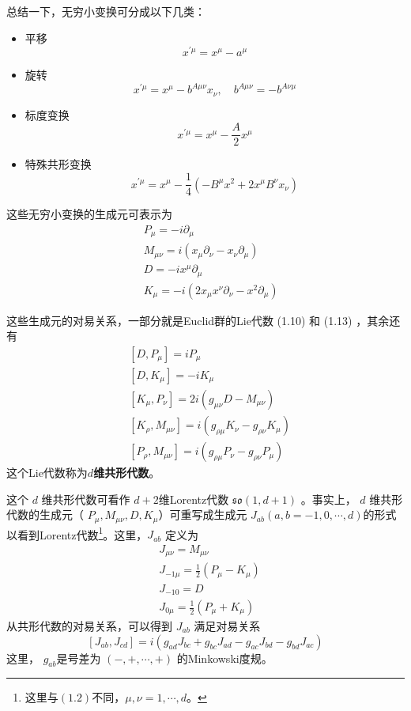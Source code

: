 总结一下，无穷小变换可分成以下几类：
\begin{itemize}
	\item 平移
	\begin{equation}
		x^{\prime \mu}=x^{\mu}-a^{\mu}
	\end{equation}	
	\item 旋转
	\begin{equation}
		x^{\prime \mu}=x^{\mu}-b^{A \mu \nu} x_{\nu}, \quad b^{A \mu \nu}=-b^{A \nu \mu}
	\end{equation}
	\item 标度变换
	\begin{equation}
		x^{\prime \mu}=x^{\mu}-\frac{A}{2} x^{\mu}
	\end{equation}
	\item 特殊共形变换
	\begin{equation}
		x^{\prime \mu}=x^{\mu}-\frac{1}{4}\left(-B^{\mu} x^{2}+2 x^{\mu} B^{\nu} x_{\nu}\right)
	\end{equation}
\end{itemize}
这些无穷小变换的生成元可表示为
	\begin{align} &P_{\mu}=-i \partial_{\mu} \\ &M_{\mu \nu}=i\left(x_{\mu} \partial_{\nu}-x_{\nu} \partial_{\mu}\right) \\\ &D=-i x^{\mu} \partial_{\mu} \\ &K_{\mu}=-i\left(2 x_{\mu} x^{\nu} \partial_{\nu}-x^{2} \partial_{\mu}\right)  \end{align}

这些生成元的对易关系，一部分就是Euclid群的Lie代数 (1.10) 和 (1.13) ，其余还有
\begin{align} &\left[D, P_{\mu}\right]=i P_{\mu}\\ &\left[D, K_{\mu}\right]=-i K_{\mu} \\ &\left[K_{\mu}, P_{\nu}\right]=2 i\left(g_{\mu \nu} D-M_{\mu \nu}\right) \\ &\left[K_{\rho}, M_{\mu \nu}\right]=i\left(g_{\rho \mu} K_{\nu}-g_{\rho \nu} K_{\mu}\right) \\ &\left[P_{\rho}, M_{\mu \nu}\right]=i\left(g_{\rho \mu} P_{\nu}-g_{\rho \nu} P_{\mu}\right) 
\end{align}
这个Lie代数称为\textbf{$ d $维共形代数}。

这个 $d$ 维共形代数可看作 $d+2 $维Lorentz代数 $\mathfrak{so}(1,d+1)$ 。事实上， $d$ 维共形代数的生成元（ $P_{\mu}, M_{\mu \nu}, D, K_{\mu} $）可重写成生成元 $J_{ab} (a,b=-1,0,\cdots,d )$的形式以看到Lorentz代数\footnote{这里与$(1.2)$不同，$\mu,\nu=1, \cdots, d$。}。这里，$ J_{ab}$ 定义为
	\begin{align} &J_{\mu \nu}=M_{\mu \nu}\\ &J_{-1 \mu}=\frac{1}{2}\left(P_{\mu}-K_{\mu}\right) \\ &J_{-10}=D \\ &J_{0 \mu}=\frac{1}{2}\left(P_{\mu}+K_{\mu}\right)  \end{align}
从共形代数的对易关系，可以得到 $J_{ab}$ 满足对易关系
\begin{equation}
	\left[J_{a b}, J_{c d}\right]=i\left(g_{a d} J_{b c}+g_{b c} J_{a d}-g_{a c} J_{b d}-g_{b d} J_{a c}\right)
\end{equation}
这里， $g_{ab} $是号差为 $(-,+, \cdots,+)$ 的Minkowski度规。

